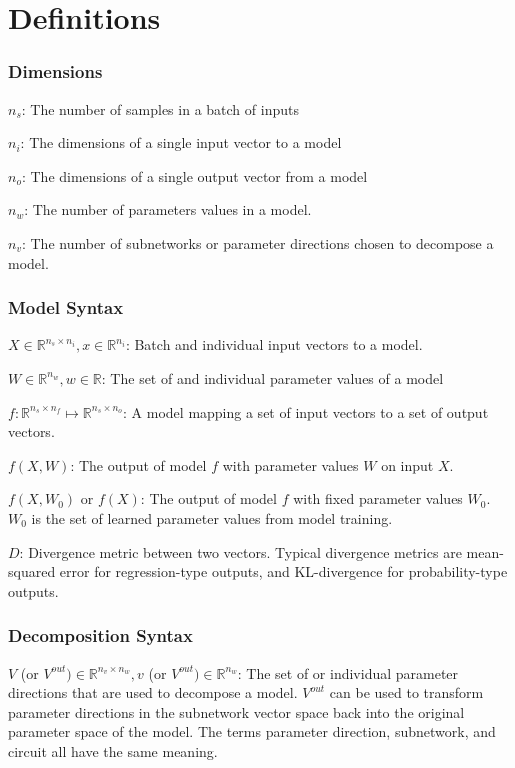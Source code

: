 \documentclass{article}
\theoremstyle{plain}
\theoremstyle{definition}
\theoremstyle{remark}
\begin{document}
\section{Definitions}

\subsubsection{Dimensions}
$n_s$: The number of samples in a batch of inputs 

$n_i$: The dimensions of a single input vector to a model

$n_o$: The dimensions of a single output vector from a model

$n_w$: The number of parameters values in a model.

$n_v$: The number of subnetworks or parameter directions chosen to decompose a model. 


\subsubsection{Model Syntax}
$X \in \mathbb{R}^{n_s \times n_i}, x \in \mathbb{R}^{n_i}$: Batch and individual input vectors to a model.

$W \in \mathbb{R}^{n_w}, w \in \mathbb{R}$: The set of and individual parameter values of a model

$f: \mathbb{R}^{n_s \times n_f} \mapsto \mathbb{R}^{n_s \times n_o}$: A model mapping a set of input vectors to a set of output vectors.

$f(X, W)$: The output of model $f$ with parameter values $W$ on input $X$.

$f(X, W_0)$ or $f(X)$: The output of model $f$ with fixed parameter values $W_0 $. $W_0$ is the set of learned parameter values from model training.

$D$: Divergence metric between two vectors. Typical divergence metrics are mean-squared error for regression-type outputs, and KL-divergence for probability-type outputs. 

\subsubsection{Decomposition Syntax}
$V$ (or $V^{out}) \in \mathbb{R}^{n_v \times n_w}, v$ (or $V^{out})  \in \mathbb{R}^{n_w}$: The set of or individual parameter directions that are used to decompose a model. $V^{out}$ can be used to transform parameter directions in the subnetwork vector space back into the original parameter space of the model. The terms parameter direction, subnetwork, and circuit all have the same meaning. 
\end{document}
